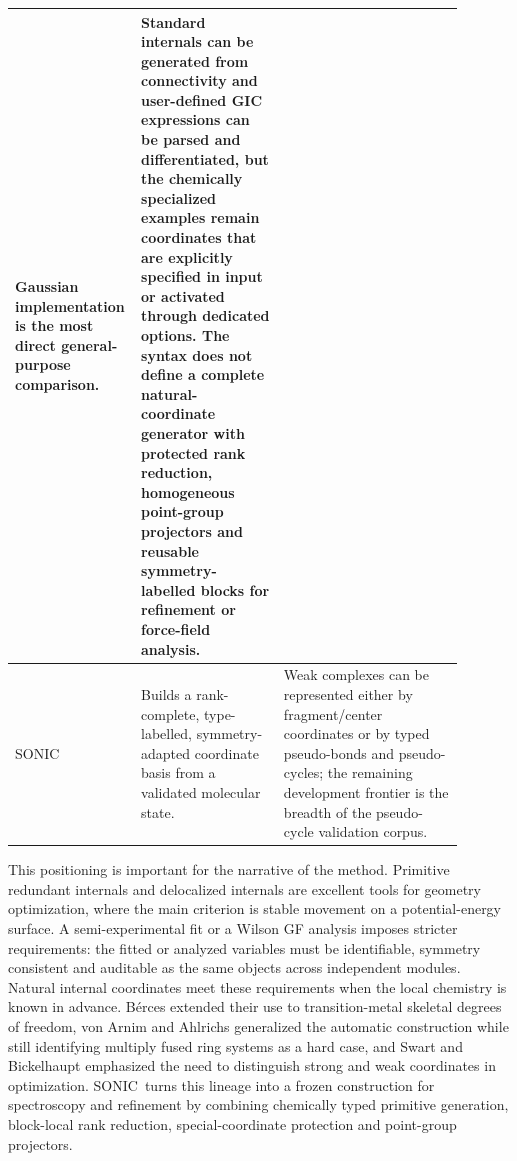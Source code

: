 \documentclass[journal=jctcce,manuscript=article,layout=traditional]{achemso}
\newcommand{\SONIC}{SONIC}
\theoremstyle{definition}
\begin{document}
\begin{table}[htbp]
\begin{tabular}{p{0.19\linewidth}p{0.31\linewidth}p{0.39\linewidth}}
Gaussian implementation is the most direct general-purpose
comparison.\cite{Marenich2025GIC} & Standard internals can be generated from
connectivity and user-defined GIC expressions can be parsed and differentiated,
but the chemically specialized examples remain coordinates that are explicitly
specified in input or activated through dedicated options.  The syntax does not
define a complete natural-coordinate generator with protected rank reduction,
homogeneous point-group projectors and reusable symmetry-labelled blocks for
refinement or force-field analysis. \\
\midrule
\SONIC & Builds a rank-complete, type-labelled, symmetry-adapted coordinate basis
from a validated molecular state. & Weak complexes can be represented either
by fragment/center coordinates or by typed pseudo-bonds and
pseudo-cycles; the remaining development frontier is the breadth of the
pseudo-cycle validation corpus. \\
\bottomrule
\end{tabular}
\end{table}

This positioning is important for the narrative of the method.  Primitive
redundant internals and delocalized internals are excellent tools for geometry
optimization, where the main criterion is stable movement on a potential-energy
surface.  A semi-experimental fit or a Wilson GF analysis imposes stricter
requirements: the fitted or analyzed variables must be identifiable, symmetry
consistent and auditable as the same objects across independent modules.
Natural internal coordinates meet these requirements when the local chemistry is
known in advance.  B{\'e}rces extended their use to transition-metal skeletal
degrees of freedom,\cite{Berces1997NaturalMetal} von Arnim and Ahlrichs
generalized the automatic construction while still identifying multiply fused
ring systems as a hard case,\cite{VonArnimAhlrichs1999GNIC} and Swart and
Bickelhaupt emphasized the need to distinguish strong and weak coordinates in
optimization.\cite{SwartBickelhaupt2006StrongWeak}  \SONIC\ turns this lineage
into a frozen construction for spectroscopy and refinement by combining
chemically typed primitive generation, block-local rank reduction,
special-coordinate protection and point-group projectors.
\end{document}
